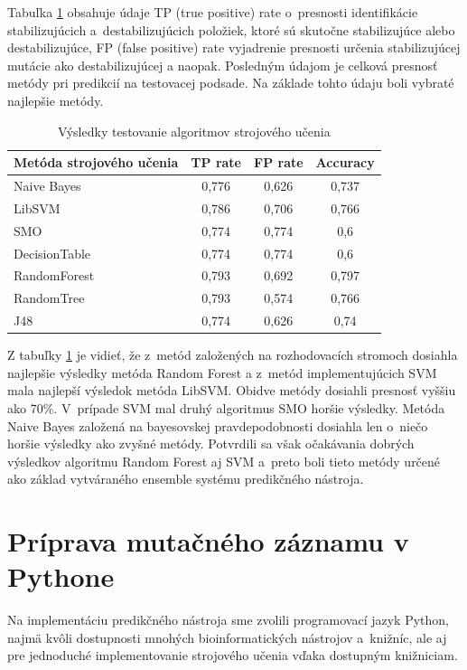 Tabuľka \ref{testovanie} obsahuje údaje TP (true positive) rate o~presnosti identifikácie stabilizujúcich a~destabilizujúcich položiek, ktoré sú skutočne stabilizujúce alebo destabilizujúce, FP (false positive) rate vyjadrenie presnosti určenia stabilizujúcej mutácie ako destabilizujúcej a naopak. Posledným údajom je celková presnosť metódy pri predikcií na testovacej podsade. Na základe tohto údaju boli vybraté najlepšie metódy.

\begin{table}[H]
	\centering
	\begin{tabular}{ | l | c | c | c| }
		\hline 
		Metóda strojového učenia & TP rate & FP rate & Accuracy \\ \hline
		Naive Bayes & 0,776 & 0,626 & 0,737 \\ \hline
		LibSVM &  0,786   & 0,706   & 0,766  \\ \hline
		SMO & 0,774 & 0,774 & 0,6\\ \hline
		DecisionTable & 0,774 & 0,774 & 0,6\\ \hline
		RandomForest & 0,793 & 0,692 & 0,797\\ \hline
		RandomTree & 0,793 & 0,574 & 0,766\\ \hline
		J48 & 0,774 & 0,626 & 0,74\\ \hline		
	\end{tabular}
	\caption {Výsledky testovanie algoritmov strojového učenia} \label{testovanie} 
\end{table}

Z tabuľky \ref{testovanie} je vidieť, že z~metód založených na rozhodovacích stromoch dosiahla najlepšie výsledky metóda Random Forest a z~metód implementujúcich SVM mala najlepší výsledok metóda LibSVM. Obidve metódy dosiahli presnosť vyššiu ako 70\%. V~prípade SVM mal druhý algoritmus SMO horšie výsledky. Metóda Naive Bayes založená na bayesovskej pravdepodobnosti dosiahla len o~niečo horšie výsledky ako zvyšné metódy. Potvrdili sa však očakávania dobrých výsledkov algoritmu Random Forest aj SVM a~preto boli tieto metódy určené ako základ vytváraného ensemble systému predikčného nástroja.

\section{Príprava mutačného záznamu v Pythone}

Na implementáciu predikčného nástroja sme zvolili programovací jazyk Python, najmä kvôli dostupnosti mnohých bioinformatických nástrojov a~knižníc, ale aj pre jednoduché implementovanie strojového učenia vďaka dostupným knižniciam.

